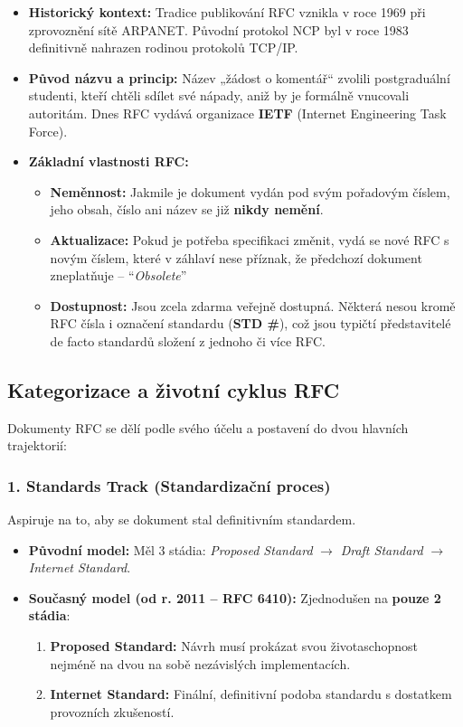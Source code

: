 \documentclass[10pt,a4paper]{article}
\begin{document}
	\begin{itemize}
		\item \textbf{Historický kontext:} Tradice publikování RFC vznikla v roce 1969 při zprovoznění sítě ARPANET. Původní protokol NCP byl v roce 1983 definitivně nahrazen rodinou protokolů TCP/IP.
		\item \textbf{Původ názvu a princip:} Název „žádost o komentář“ zvolili postgraduální studenti, kteří chtěli sdílet své nápady, aniž by je formálně vnucovali autoritám. Dnes RFC vydává organizace \textbf{IETF} (Internet Engineering Task Force).
		\item \textbf{Základní vlastnosti RFC:}
		\begin{itemize}
			\item \textbf{Neměnnost:} Jakmile je dokument vydán pod svým pořadovým číslem, jeho obsah, číslo ani název se již \textbf{nikdy nemění}.
			\item \textbf{Aktualizace:} Pokud je potřeba specifikaci změnit, vydá se nové RFC s novým číslem, které v záhlaví nese příznak, že předchozí dokument zneplatňuje -- ``\textit{Obsolete}''
			\item \textbf{Dostupnost:} Jsou zcela zdarma veřejně dostupná. Některá nesou kromě RFC čísla i označení standardu (\textbf{STD \#}), což jsou typičtí představitelé de facto standardů složení z jednoho či více RFC.
		\end{itemize}
	\end{itemize}
	
	\subsection{Kategorizace a životní cyklus RFC}
	Dokumenty RFC se dělí podle svého účelu a postavení do dvou hlavních trajektorií:
	
	\subsubsection*{1. Standards Track (Standardizační proces)}
	Aspiruje na to, aby se dokument stal definitivním standardem.
	\begin{itemize}
		\item \textbf{Původní model:} Měl 3 stádia: \textit{Proposed Standard} $\rightarrow$ \textit{Draft Standard} $\rightarrow$ \textit{Internet Standard}.
		\item \textbf{Současný model (od r. 2011 – RFC 6410):} Zjednodušen na \textbf{pouze 2 stádia}:
		\begin{enumerate}
			\item \textbf{Proposed Standard:} Návrh musí prokázat svou životaschopnost nejméně na dvou na sobě nezávislých implementacích.
			\item \textbf{Internet Standard:} Finální, definitivní podoba standardu s dostatkem provozních zkušeností.
		\end{enumerate}
	\end{itemize}
	
\end{document}
